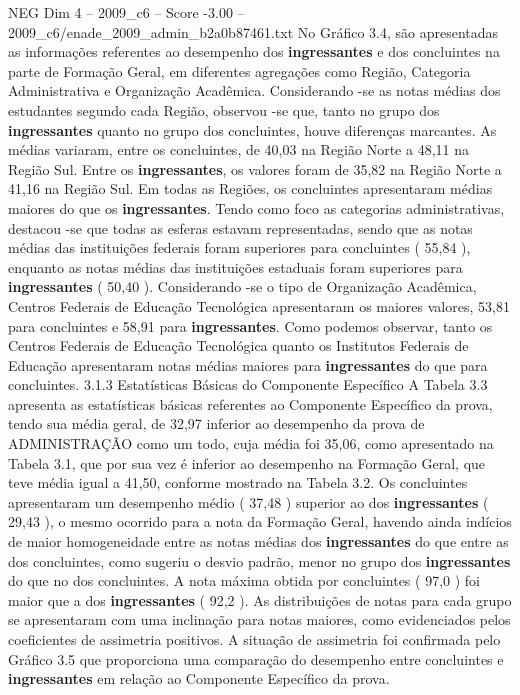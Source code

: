 \begin{textsample}{NEG Dim 4 – 2009\_c6 – Score -3.00 – 2009\_c6/enade\_2009\_admin\_b2a0b87461.txt}
No Gráfico 3.4, são apresentadas as informações referentes ao desempenho dos \textbf{ingressantes} e dos concluintes na parte de Formação Geral, em diferentes agregações como Região, Categoria Administrativa e Organização Acadêmica.
Considerando -se as notas médias dos estudantes segundo cada Região, observou -se que, tanto no grupo dos \textbf{ingressantes} quanto no grupo dos concluintes, houve diferenças marcantes.
As médias variaram, entre os concluintes, de 40,03 na Região Norte a 48,11 na Região Sul.
Entre os \textbf{ingressantes}, os valores foram de 35,82 na Região Norte a 41,16 na Região Sul.
Em todas as Regiões, os concluintes apresentaram médias maiores do que os \textbf{ingressantes}.
Tendo como foco as categorias administrativas, destacou -se que todas as esferas estavam representadas, sendo que as notas médias das instituições federais foram superiores para concluintes ( 55,84 ), enquanto as notas médias das instituições estaduais foram superiores para \textbf{ingressantes} ( 50,40 ).
Considerando -se o tipo de Organização Acadêmica, Centros Federais de Educação Tecnológica apresentaram os maiores valores, 53,81 para concluintes e 58,91 para \textbf{ingressantes}.
Como podemos observar, tanto os Centros Federais de Educação Tecnológica quanto os Institutos Federais de Educação apresentaram notas médias maiores para \textbf{ingressantes} do que para concluintes. 3.1.3 Estatísticas Básicas do Componente Específico A Tabela 3.3 apresenta as estatísticas básicas referentes ao Componente Específico da prova, tendo sua média geral, de 32,97 inferior ao desempenho da prova de ADMINISTRAÇÃO como um todo, cuja média foi 35,06, como apresentado na Tabela 3.1, que por sua vez é inferior ao desempenho na Formação Geral, que teve média igual a 41,50, conforme mostrado na Tabela 3.2.
Os concluintes apresentaram um desempenho médio ( 37,48 ) superior ao dos \textbf{ingressantes} ( 29,43 ), o mesmo ocorrido para a nota da Formação Geral, havendo ainda indícios de maior homogeneidade entre as notas médias dos \textbf{ingressantes} do que entre as dos concluintes, como sugeriu o desvio padrão, menor no grupo dos \textbf{ingressantes} do que no dos concluintes.
A nota máxima obtida por concluintes ( 97,0 ) foi maior que a dos \textbf{ingressantes} ( 92,2 ).
As distribuições de notas para cada grupo se apresentaram com uma inclinação para notas maiores, como evidenciados pelos coeficientes de assimetria positivos.
A situação de assimetria foi confirmada pelo Gráfico 3.5 que proporciona uma comparação do desempenho entre concluintes e \textbf{ingressantes} em relação ao Componente Específico da prova.

\end{textsample}
